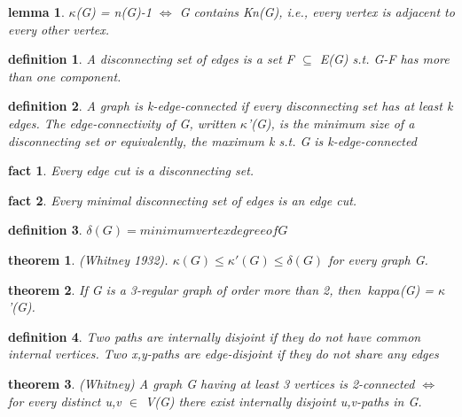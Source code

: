 \documentclass[twocolumn]{article}
\newtheorem{theorem}{theorem}[section]  %
\newtheorem{definition}{definition}
\newtheorem{lemma}{lemma}
\newtheorem{fact}{fact}
\begin{document}
\begin{CJK*}{UTF8}{bkai}
    \begin{lemma}
        $\kappa$(G) = n(G)-1 $\iff$ G contains Kn(G), i.e., every vertex is adjacent to every
 other vertex.
    \end{lemma}

    \begin{definition}
         A disconnecting set of edges is a set F $\subseteq $ E(G) s.t. G-F has more than one
 component.
    \end{definition}

    \begin{definition}
         A graph is k-edge-connected if every disconnecting set has at least k edges.
 The edge-connectivity of G, written $
 \kappa$'(G), is the minimum size of a
 disconnecting set or equivalently, the maximum k s.t. G is k-edge-connected
    \end{definition}

    \begin{fact}
    Every edge cut is a disconnecting set.
    \end{fact}

    \begin{fact}
         Every minimal disconnecting set of edges is an edge cut.
    \end{fact}

    \begin{definition}
        $\delta (G) = minimum vertex degree of G$
    \end{definition}

    \begin{theorem}{ (Whitney 1932).}
         $\kappa (G) \leq \kappa '(G) \leq \delta (G)$ for every graph G.
    \end{theorem}

    \begin{theorem}
         If G is a 3-regular graph of order more than 2, then $\
         kappa $(G) = $\kappa $'(G).
    \end{theorem}

    \begin{definition}
         Two paths are internally disjoint if they do not have common internal vertices.
         Two x,y-paths are edge-disjoint if they do not share any edges
        \end{definition}

    \begin{theorem}{(Whitney)}
         A graph G having at least 3 vertices is 2-connected $\iff$ for every distinct
 u,v $\in$ V(G) there exist internally disjoint u,v-paths in G.
    \end{theorem}


\end{CJK*}
\end{document}
